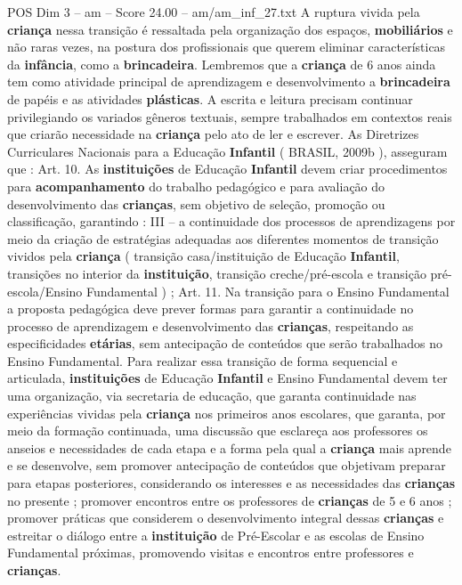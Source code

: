 \begin{textsample}{POS Dim 3 – am – Score 24.00 – am/am\_inf\_27.txt}
A ruptura vivida pela \textbf{criança} nessa transição é ressaltada pela organização dos espaços, \textbf{mobiliários} e não raras vezes, na postura dos profissionais que querem eliminar características da \textbf{infância}, como a \textbf{brincadeira}.
Lembremos que a \textbf{criança} de 6 anos ainda tem como atividade principal de aprendizagem e desenvolvimento a \textbf{brincadeira} de papéis e as atividades \textbf{plásticas}.
A escrita e leitura precisam continuar privilegiando os variados gêneros textuais, sempre trabalhados em contextos reais que criarão necessidade na \textbf{criança} pelo ato de ler e escrever.
As Diretrizes Curriculares Nacionais para a Educação \textbf{Infantil} ( BRASIL, 2009b ), asseguram que : Art. 10.
As \textbf{instituições} de Educação \textbf{Infantil} devem criar procedimentos para \textbf{acompanhamento} do trabalho pedagógico e para avaliação do desenvolvimento das \textbf{crianças}, sem objetivo de seleção, promoção ou classificação, garantindo : III – a continuidade dos processos de aprendizagens por meio da criação de estratégias adequadas aos diferentes momentos de transição vividos pela \textbf{criança} ( transição casa/instituição de Educação \textbf{Infantil}, transições no interior da \textbf{instituição}, transição creche/pré-escola e transição pré-escola/Ensino Fundamental ) ; Art. 11.
Na transição para o Ensino Fundamental a proposta pedagógica deve prever formas para garantir a continuidade no processo de aprendizagem e desenvolvimento das \textbf{crianças}, respeitando as especificidades \textbf{etárias}, sem antecipação de conteúdos que serão trabalhados no Ensino Fundamental.
Para realizar essa transição de forma sequencial e articulada, \textbf{instituições} de Educação \textbf{Infantil} e Ensino Fundamental devem ter uma organização, via secretaria de educação, que garanta continuidade nas experiências vividas pela \textbf{criança} nos primeiros anos escolares, que garanta, por meio da formação continuada, uma discussão que esclareça aos professores os anseios e necessidades de cada etapa e a forma pela qual a \textbf{criança} mais aprende e se desenvolve, sem promover antecipação de conteúdos que objetivam preparar para etapas posteriores, considerando os interesses e as necessidades das \textbf{crianças} no presente ; promover encontros entre os professores de \textbf{crianças} de 5 e 6 anos ; promover práticas que considerem o desenvolvimento integral dessas \textbf{crianças} e estreitar o diálogo entre a \textbf{instituição} de Pré-Escolar e as escolas de Ensino Fundamental próximas, promovendo visitas e encontros entre professores e \textbf{crianças}.

\end{textsample}
